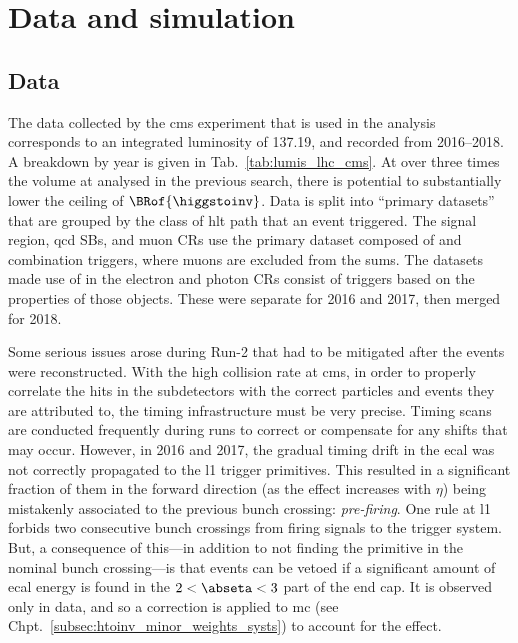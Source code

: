 \section{Data and simulation}
\label{sec:htoinv_data_sim}




\subsection{Data}
\label{subsec:htoinv_data}

The data collected by the \acrshort{cms} experiment that is used in the analysis corresponds to an integrated luminosity of 137.19\fbinv, and recorded from 2016--2018. A breakdown by year is given in Tab.~\ref{tab:lumis_lhc_cms}. At over three times the volume at \comruntwo analysed in the previous search, there is potential to substantially lower the ceiling of $\BRof{\higgstoinv}$. Data is split into ``primary datasets'' that are grouped by the class of \acrshort{hlt} path that an event triggered. The signal region, \acrshort{qcd} \glspl{SB}, and muon \glspl{CR} use the primary dataset composed of \ptmiss and \htmiss combination triggers, where muons are excluded from the sums. The datasets made use of in the electron and photon \glspl{CR} consist of triggers based on the properties of those objects. These were separate for 2016 and 2017, then merged for 2018.

Some serious issues arose during Run-2 that had to be mitigated after the events were reconstructed. With the high collision rate at \acrshort{cms}, in order to properly correlate the hits in the subdetectors with the correct particles and events they are attributed to, the timing infrastructure must be very precise. Timing scans are conducted frequently during runs to correct or compensate for any shifts that may occur. However, in 2016 and 2017, the gradual timing drift in the \acrshort{ecal} was not correctly propagated to the \acrlong{l1} trigger primitives. This resulted in a significant fraction of them in the forward direction (as the effect increases with $\eta$) being mistakenly associated to the previous bunch crossing: \emph{pre-firing}. One rule at \acrlong{l1} forbids two consecutive bunch crossings from firing signals to the trigger system. But, a consequence of this---in addition to not finding the primitive in the nominal bunch crossing---is that events can be vetoed if a significant amount of \acrshort{ecal} energy is found in the $\text{2} < \abseta < \text{3}$ part of the end cap. It is observed only in data, and so a correction is applied to \acrshort{mc} (see Chpt.~\ref{subsec:htoinv_minor_weights_systs}) to account for the effect.


